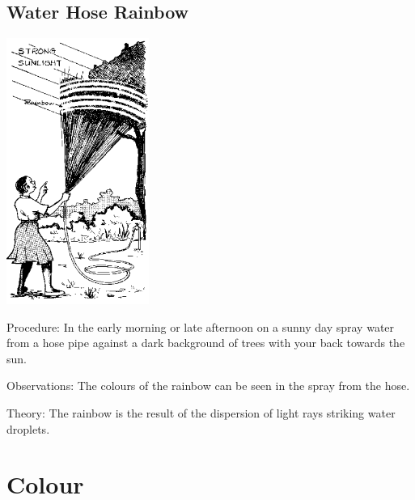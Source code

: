 \begin{multicols}{2}
\subsection{Water Hose Rainbow}

\begin{center}
\includegraphics[width=0.35\textwidth]{./img/source/water-hose-rainbow.png}
\end{center}

\begin{description*}
\item[Procedure:]{In the early morning or late afternoon on a sunny day spray water from a hose pipe against a dark background of trees with your back towards the sun.}
\item[Observations:]{The colours of the rainbow can be seen in the spray from the hose.}
\item[Theory:]{The rainbow is the result of the dispersion of light rays striking water droplets.}
\end{description*}



\section*{Colour}



\end{multicols}
